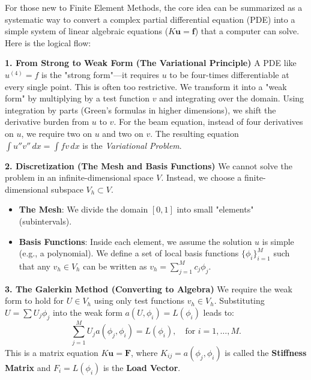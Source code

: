 \begin{remark}
For those new to Finite Element Methods, the core idea can be summarized as a systematic way to convert a complex partial differential equation (PDE) into a simple system of linear algebraic equations ($K \mathbf{u} = \mathbf{f}$) that a computer can solve. Here is the logical flow:

\textbf{1. From Strong to Weak Form (The Variational Principle)}
A PDE like $u^{(4)} = f$ is the "strong form"—it requires $u$ to be four-times differentiable at every single point. This is often too restrictive. We transform it into a "weak form" by multiplying by a test function $v$ and integrating over the domain. Using integration by parts (Green's formulas in higher dimensions), we shift the derivative burden from $u$ to $v$. For the beam equation, instead of four derivatives on $u$, we require two on $u$ and two on $v$. The resulting equation $\int u''v'' \, dx = \int fv \, dx$ is the \textit{Variational Problem}.

\textbf{2. Discretization (The Mesh and Basis Functions)}
We cannot solve the problem in an infinite-dimensional space $V$. Instead, we choose a finite-dimensional subspace $V_h \subset V$. 
\begin{itemize}
    \item \textbf{The Mesh}: We divide the domain $[0, 1]$ into small "elements" (subintervals).
    \item \textbf{Basis Functions}: Inside each element, we assume the solution $u$ is simple (e.g., a polynomial). We define a set of local basis functions $\{\phi_i\}_{i=1}^M$ such that any $v_h \in V_h$ can be written as $v_h = \sum_{j=1}^M c_j \phi_j$.
\end{itemize}

\textbf{3. The Galerkin Method (Converting to Algebra)}
We require the weak form to hold for $U \in V_h$ using only test functions $v_h \in V_h$. Substituting $U = \sum U_j \phi_j$ into the weak form $a(U, \phi_i) = L(\phi_i)$ leads to:
\[ \sum_{j=1}^M U_j a(\phi_j, \phi_i) = L(\phi_i), \quad \text{for } i=1, \dots, M. \]
This is a matrix equation $K \mathbf{u} = \mathbf{F}$, where $K_{ij} = a(\phi_j, \phi_i)$ is called the \textbf{Stiffness Matrix} and $F_i = L(\phi_i)$ is the \textbf{Load Vector}.


\end{remark}
